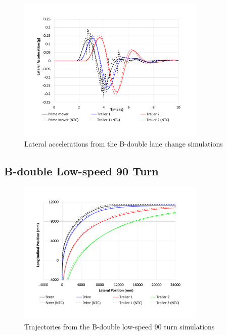     \begin{figure}[H]
        \centering
        \includegraphics[width=0.8\textwidth]{fig/ntc-b-double_lcd}
        \caption{Lateral accelerations from the B-double lane change simulations}
        \label{figure:ntc-b-double_lcd}
    \end{figure}

\subsection{B-double Low-speed 90\degree{} Turn}\label{appendix:b-double-validation-ls}

    \begin{figure}[H]
        \centering
        \includegraphics[width=0.8\textwidth]{fig/ntc-b-double_lsa}
        \caption{Trajectories from the B-double low-speed 90\degree{} turn simulations}
        \label{figure:ntc-b-double_lsa}
    \end{figure}

